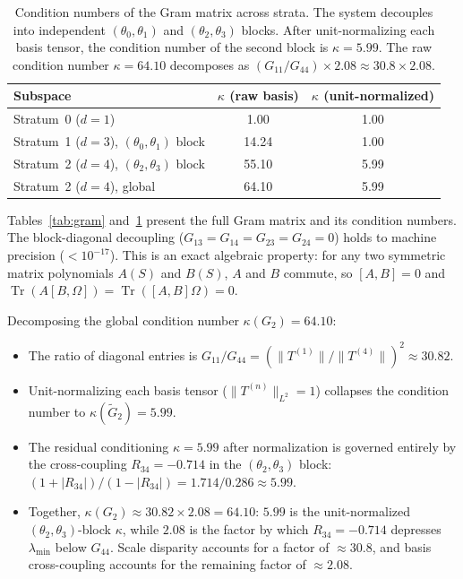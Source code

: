 \documentclass[preprint,aps,prb,longbibliography,superscriptaddress]{revtex4-2}
\newcommand{\Tr}{\operatorname{Tr}}
\begin{document}
\begin{table}[t]
\caption{Condition numbers of the Gram matrix across strata. The system
  decouples into independent $(\theta_0,\theta_1)$ and $(\theta_2,\theta_3)$
  blocks. After unit-normalizing each basis tensor, the condition number of the
  second block is $\kappa = 5.99$. The raw condition number $\kappa = 64.10$
  decomposes as $(G_{11}/G_{44}) \times 2.08 \approx 30.8 \times 2.08$.}\label{tab:kappa}
\begin{ruledtabular}
\begin{tabular}{lcc}
  Subspace & $\kappa$ (raw basis) & $\kappa$ (unit-normalized) \\
  \midrule
  Stratum~0 ($d=1$) & 1.00 & 1.00 \\
  Stratum~1 ($d=3$), $(\theta_0,\theta_1)$ block & 14.24 & 1.00 \\
  Stratum~2 ($d=4$), $(\theta_2,\theta_3)$ block & 55.10 & 5.99 \\
  Stratum~2 ($d=4$), global & 64.10 & 5.99 \\
\end{tabular}
\end{ruledtabular}
\end{table}

Tables~\ref{tab:gram} and~\ref{tab:kappa} present the full Gram matrix and its
condition numbers. The block-diagonal decoupling ($G_{13} = G_{14} = G_{23} =
G_{24} = 0$) holds to machine precision ($< 10^{-17}$). This is an exact
algebraic property: for any two symmetric matrix polynomials $A(S)$ and $B(S)$,
$A$ and $B$ commute, so $[A,B] = 0$ and
$\Tr(A[B,\Omega]) = \Tr([A,B]\Omega) = 0$.

Decomposing the global condition number $\kappa(G_2) = 64.10$:
\begin{itemize}
  \item The ratio of diagonal entries is
    $G_{11}/G_{44} = (\|T^{(1)}\|/\|T^{(4)}\|)^2 \approx 30.82$.
  \item Unit-normalizing each basis tensor ($\|T^{(n)}\|_{L^2} = 1$) collapses
    the condition number to $\kappa(\tilde{G}_2) = 5.99$.
  \item The residual conditioning $\kappa = 5.99$ after normalization is
    governed entirely by the cross-coupling $R_{34} = -0.714$ in the
    $(\theta_2,\theta_3)$ block: $(1 + |R_{34}|)/(1 - |R_{34}|) = 1.714/0.286 \approx 5.99$.
  \item Together, $\kappa(G_2) \approx 30.82 \times 2.08 = 64.10$: $5.99$ is the
    unit-normalized $(\theta_2,\theta_3)$-block $\kappa$, while $2.08$ is the factor
    by which $R_{34} = -0.714$ depresses $\lambda_{\min}$ below $G_{44}$.
    Scale disparity accounts for a factor of $\approx 30.8$, and basis cross-coupling
    accounts for the remaining factor of $\approx 2.08$.
\end{itemize}
\end{document}
